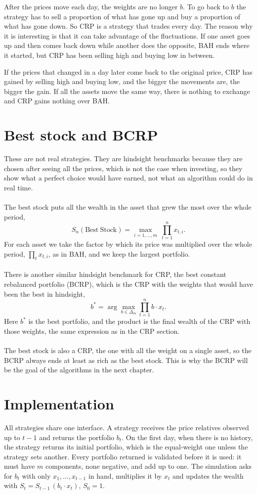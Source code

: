 After the prices move each day, the weights are no longer $b$. To go back to $b$ the strategy
has to sell a proportion of what has gone up and buy a proportion of what has gone down. So CRP is a
strategy that trades every day. The reason why it is interesting is that it can
take advantage of the fluctuations. If one asset goes up and then comes back down
while another does the opposite, BAH ends where it started, but CRP has been selling
high and buying low in between. 

If the prices that changed in a day later come back to the original price, CRP has gained by selling high and buying low,
and the bigger the movements are, the bigger the gain. If all the assets move the same way, there is nothing to exchange and CRP gains nothing over BAH.

\section{Best stock and BCRP}

These are not real strategies. They are hindsight benchmarks because they are chosen after seeing all the prices, which is not the case when investing, 
so they show what a perfect choice would have earned, not what an algorithm could do in real time.
\\ \\
The best stock puts all the wealth in the asset that grew the most over the whole
period,
\[
S_n(\mathrm{Best\ Stock}) = \max_{i=1,\dots,m}\ \prod_{t=1}^{n} x_{t,i}.
\]
For each asset we take the factor by which its price was multiplied over the whole
period, $\prod_t x_{t,i}$, as in BAH, and we keep the largest portfolio. 
\\ \\
There is another similar hindsight benchmark for CRP, the best constant rebalanced portfolio (BCRP),
which is the CRP with the weights that would have been the best in hindsight,
\[
b^\ast=\arg\max_{b\in\Delta_m}\prod_{t=1}^{n} b\cdot x_t .
\]
Here $b^\ast$ is the best portfolio, and the product is the final wealth of the CRP with
those weights, the same expression as in the CRP section.
\\ \\
The best stock is also a CRP, the one with all the weight on a single asset, so the BCRP
always ends at least as rich as the best stock. This is why the BCRP will be the goal of the algorithms in the next chapter.


\section{Implementation}

All strategies share one interface. A strategy receives the price relatives observed
up to $t-1$ and returns the portfolio $b_t$. On the first day, when there is no
history, the strategy returns its initial portfolio, which is the equal-weight one
unless the strategy sets another. Every portfolio returned is validated before it is
used: it must have $m$ components, none negative, and add up to one. The simulation
asks for $b_t$ with only $x_1,\dots,x_{t-1}$ in hand, multiplies it by $x_t$ and
updates the wealth with $S_t=S_{t-1}\,(b_t\cdot x_t)$, $S_0=1$.
